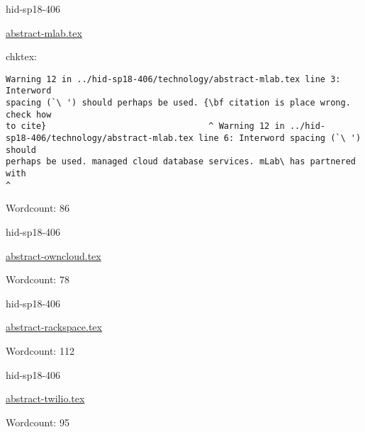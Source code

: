 \begin{IU}

hid-sp18-406

\href{https://github.com/cloudmesh-community/hid-sp18-406/blob/master//technology/abstract-mlab.tex}{abstract-mlab.tex}

 
chktex:
\begin{tiny}
\begin{verbatim}
Warning 12 in ../hid-sp18-406/technology/abstract-mlab.tex line 3: Interword
spacing (`\ ') should perhaps be used. {\bf citation is place wrong. check how
to cite}                                ^ Warning 12 in ../hid-
sp18-406/technology/abstract-mlab.tex line 6: Interword spacing (`\ ') should
perhaps be used. managed cloud database services. mLab\ has partnered with
^
\end{verbatim}
\end{tiny}

Wordcount: 86

\end{IU}



\begin{IU}

hid-sp18-406

\href{https://github.com/cloudmesh-community/hid-sp18-406/blob/master//technology/abstract-owncloud.tex}{abstract-owncloud.tex}

 

Wordcount: 78

\end{IU}



\begin{IU}

hid-sp18-406

\href{https://github.com/cloudmesh-community/hid-sp18-406/blob/master//technology/abstract-rackspace.tex}{abstract-rackspace.tex}

 

Wordcount: 112

\end{IU}



\begin{IU}

hid-sp18-406

\href{https://github.com/cloudmesh-community/hid-sp18-406/blob/master//technology/abstract-twilio.tex}{abstract-twilio.tex}

 

Wordcount: 95

\end{IU}

